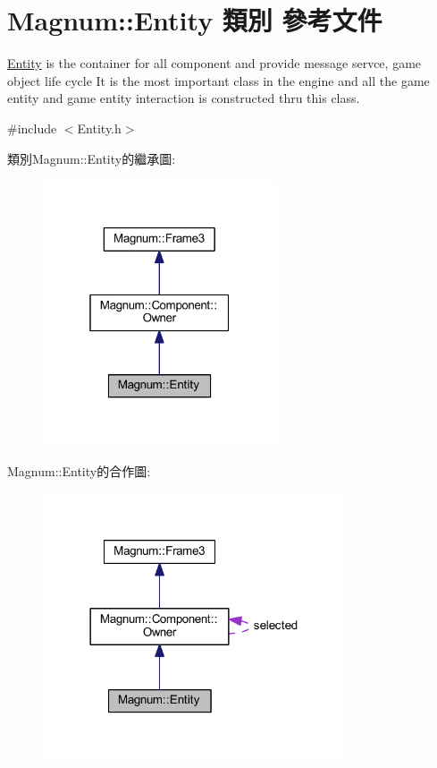 \hypertarget{class_magnum_1_1_entity}{}\section{Magnum\+:\+:Entity 類別 參考文件}
\label{class_magnum_1_1_entity}


\hyperlink{class_magnum_1_1_entity}{Entity} is the container for all component and provide message servce, game object life cycle It is the most important class in the engine and all the game entity and game entity interaction is constructed thru this class.  




{\ttfamily \#include $<$Entity.\+h$>$}



類別\+Magnum\+:\+:Entity的繼承圖\+:\nopagebreak
\begin{figure}[H]
\begin{center}
\leavevmode
\includegraphics[width=196pt]{class_magnum_1_1_entity__inherit__graph}
\end{center}
\end{figure}


Magnum\+:\+:Entity的合作圖\+:\nopagebreak
\begin{figure}[H]
\begin{center}
\leavevmode
\includegraphics[width=254pt]{class_magnum_1_1_entity__coll__graph}
\end{center}
\end{figure}
